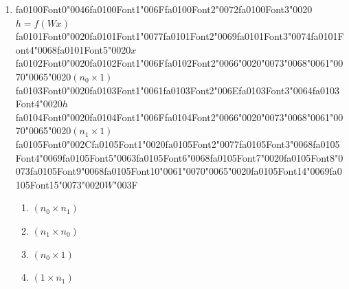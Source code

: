 \documentclass[12pt]{article}
\begin{document}
\begin{enumerate}[label=Q\arabic*.]
\begin{enumerate}[label=(\Alph*)]
    \item Both the input at time $t$ and the hidden state at time $t-1$
    \item All future inputs
\end{enumerate}
\item {\csname fa0100Font0\endcsname\char"0046}{\csname fa0100Font1\endcsname\char"006F}{\csname fa0100Font2\endcsname\char"0072}{\csname fa0100Font3\endcsname\char"0020}$h = f(Wx)${\csname fa0101Font0\endcsname\char"0020}{\csname fa0101Font1\endcsname\char"0077}{\csname fa0101Font2\endcsname\char"0069}{\csname fa0101Font3\endcsname\char"0074}{\csname fa0101Font4\endcsname\char"0068}{\csname fa0101Font5\endcsname\char"0020}$x${\csname fa0102Font0\endcsname\char"0020}{\csname fa0102Font1\endcsname\char"006F}{\csname fa0102Font2\endcsname\char"0066}{\char"0020}{\char"0073}{\char"0068}{\char"0061}{\char"0070}{\char"0065}{\char"0020}$(n_0 \times 1)${\csname fa0103Font0\endcsname\char"0020}{\csname fa0103Font1\endcsname\char"0061}{\csname fa0103Font2\endcsname\char"006E}{\csname fa0103Font3\endcsname\char"0064}{\csname fa0103Font4\endcsname\char"0020}$h${\csname fa0104Font0\endcsname\char"0020}{\csname fa0104Font1\endcsname\char"006F}{\csname fa0104Font2\endcsname\char"0066}{\char"0020}{\char"0073}{\char"0068}{\char"0061}{\char"0070}{\char"0065}{\char"0020}$(n_1 \times 1)${\csname fa0105Font0\endcsname\char"002C}{\csname fa0105Font1\endcsname\char"0020}{\csname fa0105Font2\endcsname\char"0077}{\csname fa0105Font3\endcsname\char"0068}{\csname fa0105Font4\endcsname\char"0069}{\csname fa0105Font5\endcsname\char"0063}{\csname fa0105Font6\endcsname\char"0068}{\csname fa0105Font7\endcsname\char"0020}{\csname fa0105Font8\endcsname\char"0073}{\csname fa0105Font9\endcsname\char"0068}{\csname fa0105Font10\endcsname\char"0061}{\char"0070}{\char"0065}{\char"0020}{\csname fa0105Font14\endcsname\char"0069}{\csname fa0105Font15\endcsname\char"0073}{\char"0020}$W${\char"003F}
\begin{enumerate}[label=(\Alph*)]
    \item $(n_0 \times n_1)$
    \item $(n_1 \times n_0)$
    \item $(n_0 \times 1)$
    \item $(1 \times n_1)$
\end{enumerate}

\end{enumerate}
\end{document}

